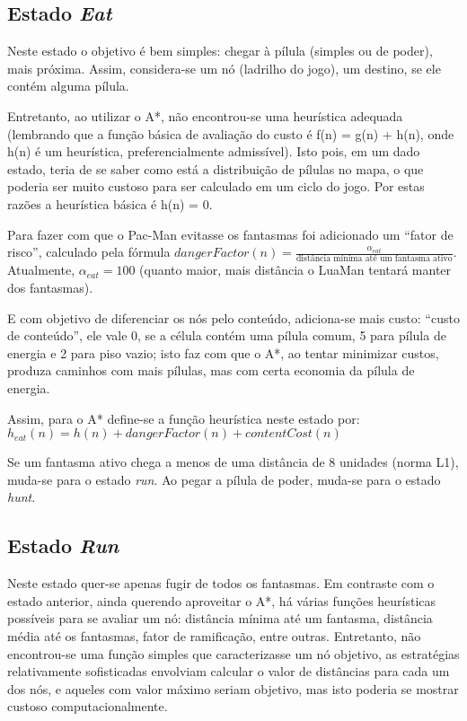 \documentclass[a4paper]{scrartcl}
\begin{document}
\subsection{Estado \textit{Eat}}

Neste estado o objetivo é bem simples: chegar à pílula (simples ou de poder), mais próxima.
Assim, considera-se um nó (ladrilho do jogo), um destino, se ele contém alguma pílula.

Entretanto, ao utilizar o A*, não encontrou-se uma heurística adequada (lembrando
que a função básica de avaliação do custo é f(n) = g(n) + h(n), onde h(n) é um heurística,
preferencialmente admissível). Isto pois, em um dado estado, teria de se saber como está a
distribuição de pílulas no mapa, o que poderia ser muito custoso para ser calculado em
um ciclo do jogo. Por estas razões a heurística básica é h(n) = 0.

Para fazer com que o Pac-Man evitasse os fantasmas foi adicionado um ``fator de risco'',
calculado pela fórmula $dangerFactor(n) =  \frac{\alpha_{eat}}{\text{distância mínima até um fantasma ativo}}$. Atualmente, $\alpha_{eat} = 100$ (quanto maior, mais distância o LuaMan
tentará manter dos fantasmas).

E com objetivo de diferenciar os nós pelo conteúdo, adiciona-se mais custo: ``custo de conteúdo'',
ele vale 0, se a célula contém uma pílula comum, 5 para pílula de energia e 2 para piso vazio; isto
faz com que o A*, ao tentar minimizar custos, produza caminhos com mais pílulas, mas com certa economia da pílula de energia.

Assim, para o A* define-se a função heurística neste estado por:
$h_{eat}(n) = h(n) + dangerFactor(n) + contentCost(n)$

Se um fantasma ativo chega a menos de uma distância de 8 unidades (norma L1), muda-se
para o estado \textit{run}. Ao pegar a pílula de poder, muda-se para o estado \textit{hunt}.

\subsection{Estado \textit{Run}}

Neste estado quer-se apenas fugir de todos os fantasmas. Em contraste com o estado anterior,
ainda querendo aproveitar o A*, há várias funções heurísticas possíveis para se avaliar um nó:
distância mínima até um fantasma, distância média até os fantasmas, fator de ramificação, entre outras. Entretanto, não encontrou-se uma função simples que caracterizasse um nó objetivo, as estratégias relativamente sofisticadas envolviam calcular o valor de distâncias para 
cada um dos nós, e aqueles com valor máximo seriam objetivo, mas isto poderia se mostrar custoso
computacionalmente. 
\end{document}
